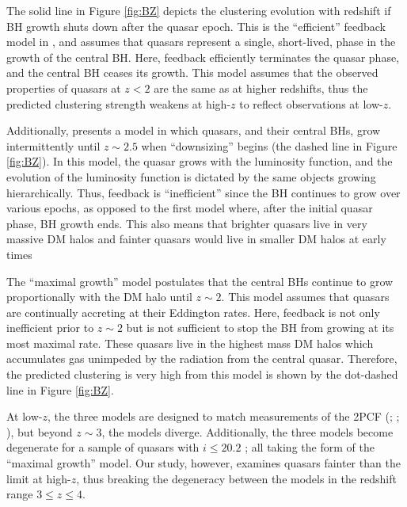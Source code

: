 \documentclass[apj, numberedappendix]{emulateapj}
\begin{document}
The solid line in Figure \ref{fig:BZ} depicts the clustering evolution with redshift if BH growth shuts down after the quasar epoch. This is the ``efficient'' feedback model in \citet{Hopkins2007}, and assumes that quasars represent a single, short-lived, phase in the growth of the central BH. Here, feedback efficiently terminates the quasar phase, and the central BH ceases its growth. This model assumes that the observed properties of quasars at $z < 2$ are the same as at higher redshifts, thus the predicted clustering strength weakens at high-$z$ to reflect observations at low-$z$.

Additionally, \citet{Hopkins2007} presents a model in which quasars, and their central BHs, grow intermittently until $z \sim 2.5$ when ``downsizing'' begins (the dashed line in Figure \ref{fig:BZ}). In this model, the quasar grows with the luminosity function, and the evolution of the luminosity function is dictated by the same objects growing hierarchically. Thus, feedback is ``inefficient'' since the BH continues to grow over various epochs, as opposed to the first model where, after the initial quasar phase, BH growth ends. This also means that brighter quasars live in very massive DM halos and fainter quasars would live in smaller DM halos at early times

The ``maximal growth'' model postulates that the central BHs continue to grow proportionally with the DM halo until $z \sim 2$. This model assumes that quasars are continually accreting at their Eddington rates. Here, feedback is not only inefficient prior to $z \sim 2$ but is not sufficient to stop the BH from growing at its most maximal rate. These quasars live in the highest mass DM halos which accumulates gas unimpeded by the radiation from the central quasar. Therefore, the predicted clustering is very high from this model is shown by the dot-dashed line in Figure \ref{fig:BZ}. 

At low-$z$, the three models are designed to match measurements of the 2PCF (\citealt{Croom2005}; \citealt{Myers2007}; \citealt{Ross2009}), but beyond $z \sim 3$, the models diverge. Additionally, the three models become degenerate for a sample of quasars with $i \leq 20.2$ \citep{Hopkins2007}; all taking the form of the ``maximal growth'' model. Our study, however, examines quasars fainter than the limit at high-$z$, thus breaking the degeneracy between the models in the redshift range $3 \leq z \leq 4$. 
\end{document}

